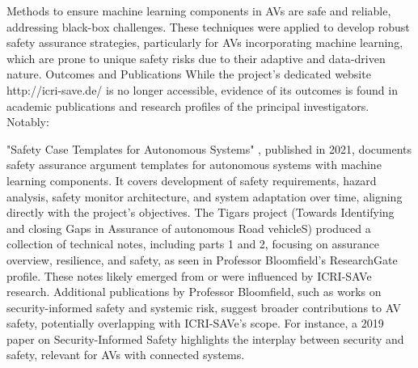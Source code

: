 Methods to ensure machine learning components in AVs are safe and reliable, addressing black-box challenges.
These techniques were applied to develop robust safety assurance strategies, particularly for AVs incorporating machine learning, which are prone to unique safety risks due to their adaptive and data-driven nature.
Outcomes and Publications
While the project's dedicated website http://icri-save.de/ is no longer accessible, evidence of its outcomes is found in academic publications and research profiles of the principal investigators. Notably:

    "Safety Case Templates for Autonomous Systems" , published in 2021, documents safety assurance argument templates for autonomous systems with machine learning components. It covers development of safety requirements, hazard analysis, safety monitor architecture, and system adaptation over time, aligning directly with the project's objectives.
    The Tigars project (Towards Identifying and closing Gaps in Assurance of autonomous Road vehicleS) produced a collection of technical notes, including parts 1 and 2, focusing on assurance overview, resilience, and safety, as seen in Professor Bloomfield's ResearchGate profile. These notes likely emerged from or were influenced by ICRI-SAVe research.
    Additional publications by Professor Bloomfield, such as works on security-informed safety and systemic risk, suggest broader contributions to AV safety, potentially overlapping with ICRI-SAVe's scope. For instance, a 2019 paper on Security-Informed Safety highlights the interplay between security and safety, relevant for AVs with connected systems.

